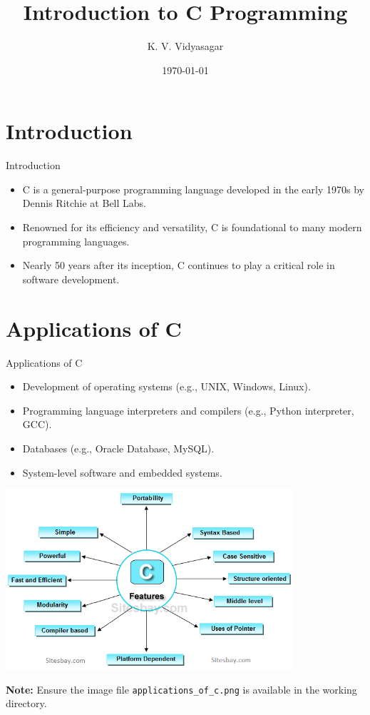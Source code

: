 \documentclass{beamer}
\title{Introduction to C Programming}
\author{K. V. Vidyasagar}
\date{\today}
\begin{document}
\frame{\titlepage}

\section{Introduction}
\begin{frame}{Introduction}
    \begin{itemize}
        \item C is a general-purpose programming language developed in the early 1970s by Dennis Ritchie at Bell Labs.
        \item Renowned for its efficiency and versatility, C is foundational to many modern programming languages.
        \item Nearly 50 years after its inception, C continues to play a critical role in software development.
    \end{itemize}
\end{frame}

\section{Applications of C}
\begin{frame}{Applications of C}
    \begin{itemize}
        \item Development of operating systems (e.g., UNIX, Windows, Linux).
        \item Programming language interpreters and compilers (e.g., Python interpreter, GCC).
        \item Databases (e.g., Oracle Database, MySQL).
        \item System-level software and embedded systems.
    \end{itemize}
    \begin{center}
        \includegraphics[width=0.8\textwidth]{applications_of_c.png} %
    \end{center}
    \pause
    \textbf{Note:} Ensure the image file \texttt{applications\_of\_c.png} is available in the working directory.
\end{frame}
\end{document}
